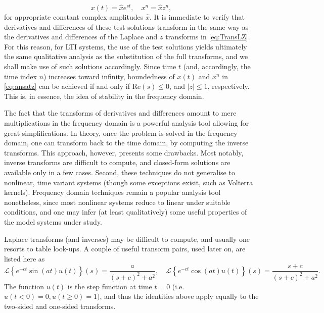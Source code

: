 \documentclass[11pt,twoside,a4paper,english]{book}
\begin{document}
\begin{equation}\label{eq:ansatz}
    x(t) = \hat x e^{st}, \quad x^n = \hat x z^n,
\end{equation}
for appropriate constant complex amplitudes $\hat x$. It is immediate to verify that derivatives and differences of these test solutions transform in the same way as the derivatives and differences of the Laplace and $z$ transforms in \eqref{eq:TransLZ}. For this reason, for LTI systems, the use of the test solutions yields ultimately  the same qualitative analysis as the substitution of the full transforms, and we shall make use of such solutions accordingly. Since time $t$ (and, accordingly, the time index $n$) increases toward infinity, boundedness of $x(t)$ and $x^n$ in \eqref{eq:ansatz} can be achieved if and only if $\text{Re}(s) \leq 0$, and $|z|\leq 1$, respectively. This is, in essence, the idea of stability in the frequency domain.



The fact that the transforms of derivatives and differences amount to mere multiplications in the frequency domain is a powerful analysis tool allowing for great simplifications. In theory, once the problem is solved in the frequency domain, one can transform back to the time domain,  by computing the inverse transforms. This approach, however, presents some drawbacks. Most notably, inverse transforms are difficult to compute, and closed-form solutions are available only in a few cases. Second, these techniques do not generalise  to nonlinear, time variant systems (though some exceptions exisit, such as Volterra kernels). Frequency domain techniques remain a popular analysis tool nonetheless, since most nonlinear systems reduce to linear under suitable conditions, and one may infer (at least qualitatively) some useful properties of the model systems under study. 


Laplace transforms (and inverses) may be difficult to compute, and usually one resorts to table look-ups. A couple of useful transorm pairs, used later on, are listed here as
\begin{equation}\label{eq:LaplTtable}
    \mathcal{L}\left\{e^{-ct}\sin(a t)u(t)\right\}(s) = \frac{a}{(s+c)^2 + a^2}, \quad \mathcal{L}\left\{e^{-ct}\cos(a t)u(t)\right\}(s) = \frac{s+c}{(s+c)^2 + a^2}.
\end{equation}
The function $u(t)$ is the step function at time $t=0$ (i.e. $u(t<0)=0, u(t\geq 0) = 1)$, and thus the identities above apply equally to the two-sided and one-sided transforms. 
\end{document}
